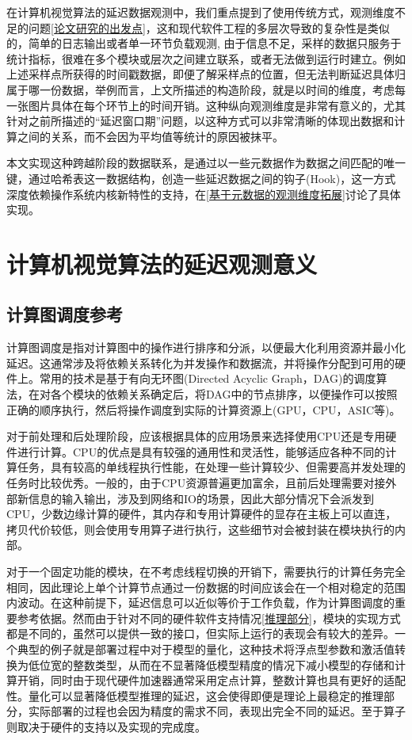 \documentclass[master,anonymous]{shtthesis}
\begin{document}
在计算机视觉算法的延迟数据观测中，我们重点提到了使用传统方式，观测维度不足的问题\ref{论文研究的出发点}，这和现代软件工程的多层次导致的复杂性是类似的，简单的日志输出或者单一环节负载观测, 由于信息不足，采样的数据只服务于统计指标，很难在多个模块或层次之间建立联系，或者无法做到运行时建立。例如上述采样点所获得的时间戳数据，即便了解采样点的位置，但无法判断延迟具体归属于哪一份数据，举例而言，上文所描述的构造阶段，就是以时间的维度，考虑每一张图片具体在每个环节上的时间开销。这种纵向观测维度是非常有意义的，尤其针对之前所描述的“延迟窗口期”问题，以这种方式可以非常清晰的体现出数据和计算之间的关系，而不会因为平均值等统计的原因被抹平。

本文实现这种跨越阶段的数据联系，是通过以一些元数据作为数据之间匹配的唯一键，通过哈希表这一数据结构，创造一些延迟数据之间的钩子(Hook)，这一方式深度依赖操作系统内核新特性的支持，在\ref{基于元数据的观测维度拓展}讨论了具体实现。

\section{计算机视觉算法的延迟观测意义}\label{计算机视觉算法的延迟观测意义}
\subsection{计算图调度参考}\label{计算图调度参考}
计算图调度是指对计算图中的操作进行排序和分派，以便最大化利用资源并最小化延迟。这通常涉及将依赖关系转化为并发操作和数据流，并将操作分配到可用的硬件上。常用的技术是基于有向无环图(Directed Acyclic Graph，DAG)的调度算法，在对各个模块的依赖关系确定后，将DAG中的节点排序，以便操作可以按照正确的顺序执行，然后将操作调度到实际的计算资源上(GPU，CPU，ASIC等)。

对于前处理和后处理阶段，应该根据具体的应用场景来选择使用CPU还是专用硬件进行计算。CPU的优点是具有较强的通用性和灵活性，能够适应各种不同的计算任务，具有较高的单线程执行性能，在处理一些计算较少、但需要高并发处理的任务时比较优秀。一般的，由于CPU资源普遍更加富余，且前后处理需要对接外部新信息的输入输出，涉及到网络和IO的场景，因此大部分情况下会派发到CPU，少数边缘计算的硬件，其内存和专用计算硬件的显存在主板上可以直连，拷贝代价较低，则会使用专用算子进行执行，这些细节对会被封装在模块执行的内部。

对于一个固定功能的模块，在不考虑线程切换的开销下，需要执行的计算任务完全相同，因此理论上单个计算节点通过一份数据的时间应该会在一个相对稳定的范围内波动。在这种前提下，延迟信息可以近似等价于工作负载，作为计算图调度的重要参考依据。然而由于针对不同的硬件软件支持情况\ref{推理部分}，模块的实现方式都是不同的，虽然可以提供一致的接口，但实际上运行的表现会有较大的差异。一个典型的例子就是部署过程中对于模型的量化，这种技术将浮点型参数和激活值转换为低位宽的整数类型，从而在不显著降低模型精度的情况下减小模型的存储和计算开销，同时由于现代硬件加速器通常采用定点计算，整数计算也具有更好的适配性。量化可以显著降低模型推理的延迟，这会使得即便是理论上最稳定的推理部分，实际部署的过程也会因为精度的需求不同，表现出完全不同的延迟。至于算子则取决于硬件的支持以及实现的完成度。
\end{document}
